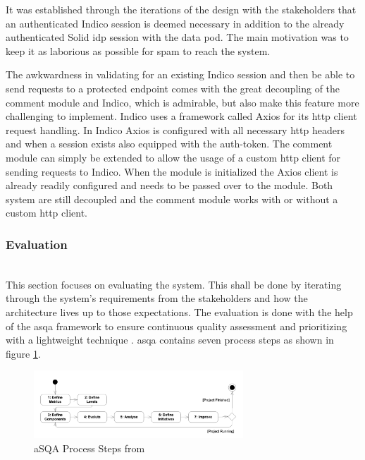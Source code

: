 It was established through the iterations of the design with the stakeholders that an authenticated Indico session is deemed necessary in addition to the already authenticated Solid \gls{idp} session with the data pod. The main motivation was to keep it as laborious as possible for spam to reach the system.

The awkwardness in validating for an existing Indico session and then be able to send requests to a protected endpoint comes with the great decoupling of the comment module and Indico, which is admirable, but also make this feature more challenging to implement. Indico uses a framework called Axios \cite{axios} for its \gls{http} client request handling. In Indico Axios is configured with all necessary \gls{http} headers and when a session exists also equipped with the auth-token. The comment module can simply be extended to allow the usage of a custom \gls{http} client for sending requests to Indico. When the module is initialized the Axios client is already readily configured and needs to be passed over to the module. Both system are still decoupled and the comment module works with or without a custom \gls{http} client.
\vspace{0.5cm}
\subsubsection{Evaluation}\label{section:poc1-evaluation}\mbox{}\\

This section focuses on evaluating the system. This shall be done by iterating through the system's requirements from the stakeholders and how the architecture lives up to those expectations. The evaluation is done with the help of the \gls{asqa} framework to ensure continuous quality assessment and prioritizing with a lightweight technique \cite{asqa-paper}.
\gls{asqa} contains seven process steps as shown in figure \ref{fig:asqa-process-steps}.

\begin{figure}[!ht]
    \centering
    \includegraphics[width=0.7\textwidth]{thesis/latex/assets/asqa-process-steps.png}
    \caption{aSQA Process Steps from \cite{asqa-paper}}
    \label{fig:asqa-process-steps}
\end{figure}

